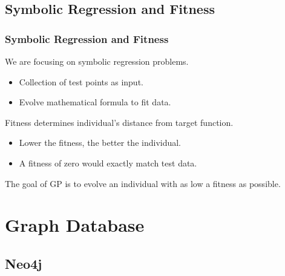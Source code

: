 \documentclass{beamer}
\newcommand{\linespace}{\vskip 0.25cm}
\begin{document}
\subsection{Symbolic Regression and Fitness}

\begin{frame}
	\frametitle{Symbolic Regression and Fitness}
	
	We are focusing on symbolic regression problems.
	\begin{itemize}
		\item Collection of test points as input.
		\item Evolve mathematical formula to fit data.
	\end{itemize}
	
	\linespace
	
	Fitness determines individual's distance from target function.
	\begin{itemize}
		\item Lower the fitness, the better the individual.
		\item A fitness of zero would exactly match test data.
	\end{itemize}
	
	\linespace 
	
	The goal of GP is to evolve an individual with as low a fitness as possible.
	
\end{frame}

\section[Graph DB]{Graph Database}
\subsection{Neo4j}
\end{document}
